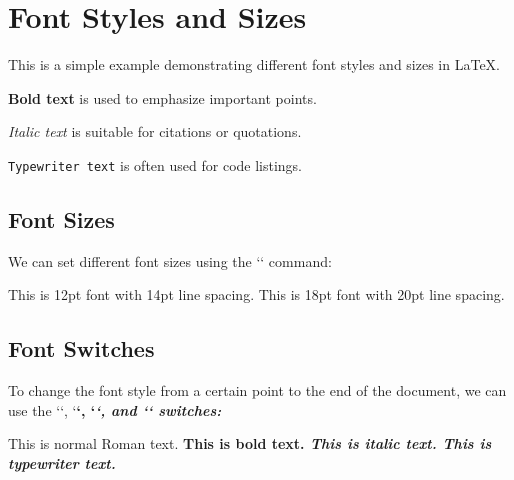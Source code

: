 \documentclass{article}
\begin{document}
\section{Font Styles and Sizes}

This is a simple example demonstrating different font styles and sizes in LaTeX.

\textbf{Bold text} is used to emphasize important points.

\textit{Italic text} is suitable for citations or quotations.

\texttt{Typewriter text} is often used for code listings.

\subsection{Font Sizes}

We can set different font sizes using the `\fontsize` command:

\fontsize{12pt}{14pt}\selectfont This is 12pt font with 14pt line spacing.
\fontsize{18pt}{20pt}\selectfont This is 18pt font with 20pt line spacing.

\subsection{Font Switches}

To change the font style from a certain point to the end of the document, we can use the `\rmfamily`, `\bfseries`, `\itshape`, and `\ttfamily` switches:

\rmfamily This is normal Roman text.
\bfseries This is bold text.
\itshape This is italic text.
\ttfamily This is typewriter text.
\end{document}
